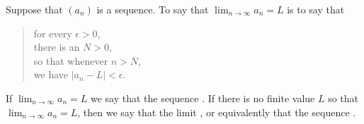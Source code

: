 \documentclass{ximera}
\begin{document}
\begin{definition}
\label{definition:limit-of-a-sequence}
Suppose that $\left(a_n\right)$ is a sequence.
To say that $\lim_{n\to \infty}a_n=L$ is to say that
\begin{quote}
\null\quad for every $\epsilon>0$, \\
\null\quad\quad there is an $N > 0$, \\
\null\quad so that whenever $n>N$, \\
\null\quad\quad we have $|a_n-L|<\epsilon$.
\end{quote}
If $\lim_{n\to\infty}a_n=L$ we say that the sequence
.  If there is no finite value $L$ so
that $\lim_{n\to\infty}a_n = L$, then we say that the limit
, or equivalently that the sequence
.
\end{definition} 
\end{document}
